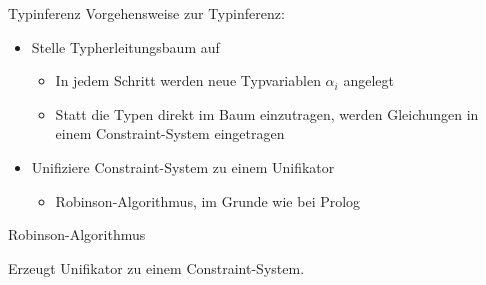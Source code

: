 \documentclass{beamer}
\newcommand{\code}[1]{
	\begin{mdframed}
		
	\end{mdframed}
}
\begin{document}
\begin{frame}{Typinferenz}
	Vorgehensweise zur Typinferenz:
	\begin{itemize}
		\item Stelle Typherleitungsbaum auf
		\begin{itemize}
			\item In jedem Schritt werden neue Typvariablen $\alpha_i$ angelegt
			\item Statt die Typen direkt im Baum einzutragen, werden Gleichungen in einem Constraint-System eingetragen
		\end{itemize}
		\item Unifiziere Constraint-System zu einem Unifikator
		\begin{itemize}
			\item Robinson-Algorithmus, im Grunde wie bei Prolog
		\end{itemize}
	\end{itemize}
\end{frame}

\begin{frame}{Robinson-Algorithmus}
	\code{code/robinson-l.pseudo}

	Erzeugt Unifikator zu einem Constraint-System.
\end{frame}
\end{document}
